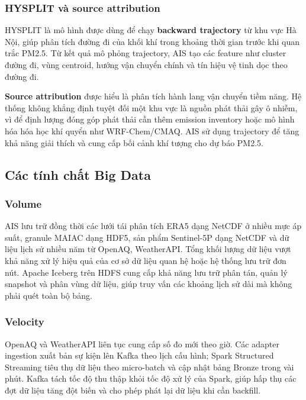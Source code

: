 \documentclass[12pt,a4paper]{article}
\begin{document}
\subsubsection{HYSPLIT và source attribution}\label{hysplit-vuxe0-source-attribution-trong-phux1ea1m-vi-ais}

HYSPLIT là mô hình được dùng để chạy \textbf{backward trajectory} từ khu vực Hà Nội, giúp phân tích đường đi của khối khí trong khoảng thời gian trước khi quan trắc PM2.5. Từ kết quả mô phỏng trajectory, AIS tạo các feature như cluster đường đi, vùng centroid, hướng vận chuyển chính và tín hiệu vệ tinh dọc theo đường đi.

\textbf{Source attribution} được hiểu là phân tích hành lang vận chuyển tiềm năng. Hệ thống không khẳng định tuyệt đối một khu vực là nguồn phát thải gây ô nhiễm, vì để định lượng đóng góp phát thải cần thêm emission inventory hoặc mô hình hóa hóa học khí quyển như WRF-Chem/CMAQ. AIS sử dụng trajectory để tăng khả năng giải thích và cung cấp bối cảnh khí tượng cho dự báo PM2.5.

\subsection{Các tính chất Big Data}\label{phuxf9-hux1ee3p-big-data}

\subsubsection{Volume}

AIS lưu trữ đồng thời các lưới tái phân tích ERA5 dạng NetCDF ở nhiều mực áp suất, granule MAIAC dạng HDF5, sản phẩm Sentinel-5P dạng NetCDF và dữ liệu lịch sử nhiều năm từ OpenAQ, WeatherAPI. Tổng khối lượng dữ liệu vượt khả năng xử lý hiệu quả của cơ sở dữ liệu quan hệ hoặc hệ thống lưu trữ đơn nút. Apache Iceberg trên HDFS cung cấp khả năng lưu trữ phân tán, quản lý snapshot và phân vùng dữ liệu, giúp truy vấn các khoảng lịch sử dài mà không phải quét toàn bộ bảng.

\subsubsection{Velocity}

OpenAQ và WeatherAPI liên tục cung cấp số đo mới theo giờ. Các adapter ingestion xuất bản sự kiện lên Kafka theo lịch cấu hình; Spark Structured Streaming tiêu thụ dữ liệu theo micro-batch và cập nhật bảng Bronze trong vài phút. Kafka tách tốc độ thu thập khỏi tốc độ xử lý của Spark, giúp hấp thụ các đợt dữ liệu tăng đột biến và cho phép phát lại dữ liệu khi cần backfill.
\end{document}
